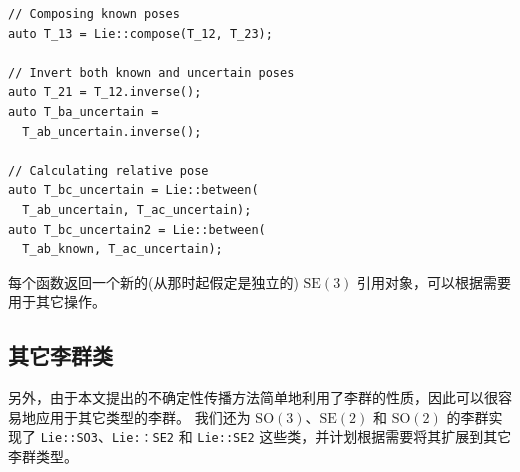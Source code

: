 \begin{verbatim}
// Composing known poses
auto T_13 = Lie::compose(T_12, T_23);
  
// Invert both known and uncertain poses
auto T_21 = T_12.inverse();
auto T_ba_uncertain = 
  T_ab_uncertain.inverse();
  
// Calculating relative pose
auto T_bc_uncertain = Lie::between(
  T_ab_uncertain, T_ac_uncertain);
auto T_bc_uncertain2 = Lie::between(
  T_ab_known, T_ac_uncertain);
\end{verbatim}

每个函数返回一个新的(从那时起假定是独立的) $\mathrm{SE}(3)$ 引用对象，可以根据需要用于其它操作。 

\subsection{其它李群类}

另外，由于本文提出的不确定性传播方法简单地利用了李群的性质，因此可以很容易地应用于其它类型的李群。 
我们还为 $\mathrm{SO}(3)$、$\mathrm{SE}(2)$ 和 $\mathrm{SO}(2)$ 的李群实现了 \texttt{Lie::SO3}、\texttt{Lie:：SE2} 和 \texttt{Lie::SE2} 这些类，并计划根据需要将其扩展到其它李群类型。 
